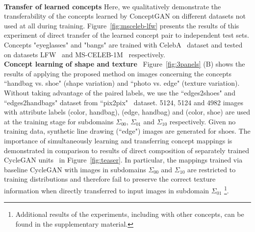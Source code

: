 \documentclass[10pt,twocolumn,letterpaper]{article}
\begin{document}
\\\textbf{Transfer of learned concepts} Here, we qualitatively demonstrate the transferability of the concepts learned by ConceptGAN on different datasets not used at all during training. Figure~\ref{fig:msceleb-lfw} presents the results of this experiment of direct transfer of the learned concept pair to independent test sets. Concepts "eyeglasses" and "bangs" are trained with CelebA~\cite{celebA} dataset and tested on datasets LFW~\cite{lfw} and MS-CELEB-1M~\cite{msceleb} respectively.
\\\textbf{Concept learning of shape and texture}
~Figure~\ref{fig:3panels} (B) shows the results of applying the proposed method on images concerning the concepts ``handbag vs. shoe" (shape variation) and ``photo vs. edge" (texture variation). Without taking advantage of the paired labels, we use the ``edges2shoes" and ``edges2handbags" dataset from ``pix2pix"~\cite{pix2pix} dataset. 5124, 5124 and 4982 images with attribute labels (color, handbag), (edge, handbag) and (color, shoe) are used at the training stage for subdomains $\Sigma_{00}$, $\Sigma_{01}$ and $\Sigma_{10}$ respectively. Given no training data, synthetic line drawing (``edge") images are generated for shoes. 
The importance of simultaneously learning and transferring concept mappings is demonstrated in comparison to results of direct composition of separately trained CycleGAN units~\cite{CycleGAN} in Figure~\ref{fig:teaser}. In particular, the mappings trained via baseline CycleGAN with images in subdomains $\Sigma_{00}$ and $\Sigma_{10}$ are restricted to training distributions and therefore fail to preserve the correct texture information when directly transferred to input images in subdomain $\Sigma_{01}$ \footnote{Additional results of the experiments, including with other concepts, can be found in the supplementary material.}.%

\end{document}
